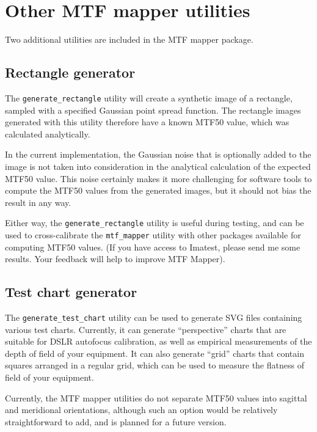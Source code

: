 \documentclass[a4paper]{article}
\begin{document}
\section{Other MTF mapper utilities}
Two additional utilities are included in the MTF mapper package.
\subsection{Rectangle generator}
\label{sec:rectangle_generator}
The \texttt{generate\_rectangle} utility will create a synthetic image of a
rectangle, sampled with a specified Gaussian point spread function. The
rectangle images generated with this utility therefore have a known MTF50
value, which was calculated analytically.

In the current implementation, the Gaussian noise that is optionally added
to the image is not taken into consideration in the analytical calculation
of the expected MTF50 value. This noise certainly makes it more challenging
for software tools to compute the MTF50 values from the generated images,
but it should not bias the result in any way. 

Either way, the \texttt{generate\_rectangle} utility is useful during
testing, and can be used to cross-calibrate the \texttt{mtf\_mapper} utility
with other packages available for computing MTF50 values. (If you have
access to Imatest, please send me some results. Your feedback will help to
improve MTF Mapper).

\subsection{Test chart generator}
The \texttt{generate\_test\_chart} utility can be used to generate SVG files
containing various test charts. Currently, it can generate ``perspective''
charts that are suitable for DSLR autofocus calibration, as well as
empirical measurements of the depth of field of your equipment. It can also
generate ``grid'' charts that contain squares arranged in a regular grid,
which can be used to measure the flatness of field of your
equipment.

Currently, the MTF mapper utilities do not separate MTF50 values into
sagittal and meridional orientations, although such an option would be
relatively straightforward to add, and is planned for a future version.
\end{document}
